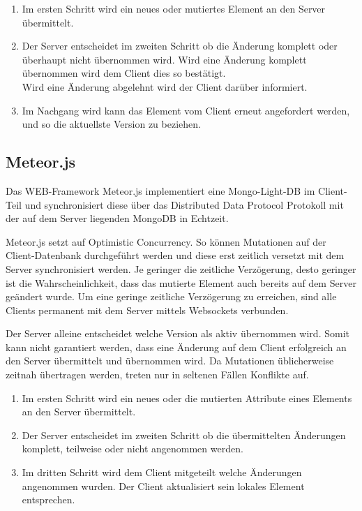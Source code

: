 \documentclass[oneside,11pt,parskip=half,ngerman]{scrreprt}
\begin{document}
\begin{enumerate}
\def\labelenumi{\arabic{enumi}.}
\itemsep1pt\parskip0pt
\item
  Im ersten Schritt wird ein neues oder mutiertes Element an den Server
  übermittelt.
\item
  Der Server entscheidet im zweiten Schritt ob die Änderung komplett
  oder überhaupt nicht übernommen wird. Wird eine Änderung komplett
  übernommen wird dem Client dies so bestätigt.\\Wird eine Änderung
  abgelehnt wird der Client darüber informiert.
\item
  Im Nachgang wird kann das Element vom Client erneut angefordert
  werden, und so die aktuellste Version zu beziehen.
\end{enumerate}

\subsection{Meteor.js}\label{meteor.js}

Das WEB-Framework Meteor.js implementiert eine Mongo-Light-DB im
Client-Teil und synchronisiert diese über das Distributed Data Protocol
Protokoll mit der auf dem Server liegenden MongoDB in Echtzeit.

Meteor.js setzt auf Optimistic Concurrency. So können Mutationen auf der
Client-Datenbank durchgeführt werden und diese erst zeitlich versetzt
mit dem Server synchronisiert werden. Je geringer die zeitliche
Verzögerung, desto geringer ist die Wahrscheinlichkeit, dass das
mutierte Element auch bereits auf dem Server geändert wurde. Um eine
geringe zeitliche Verzögerung zu erreichen, sind alle Clients permanent
mit dem Server mittels Websockets verbunden.

Der Server alleine entscheidet welche Version als aktiv übernommen wird.
Somit kann nicht garantiert werden, dass eine Änderung auf dem Client
erfolgreich an den Server übermittelt und übernommen wird. Da Mutationen
üblicherweise zeitnah übertragen werden, treten nur in seltenen Fällen
Konflikte auf.

\begin{enumerate}
\def\labelenumi{\arabic{enumi}.}
\itemsep1pt\parskip0pt
\item
  Im ersten Schritt wird ein neues oder die mutierten Attribute eines
  Elements an den Server übermittelt.
\item
  Der Server entscheidet im zweiten Schritt ob die übermittelten
  Änderungen komplett, teilweise oder nicht angenommen werden.
\item
  Im dritten Schritt wird dem Client mitgeteilt welche Änderungen
  angenommen wurden. Der Client aktualisiert sein lokales Element
  entsprechen.
\end{enumerate}
\end{document}
